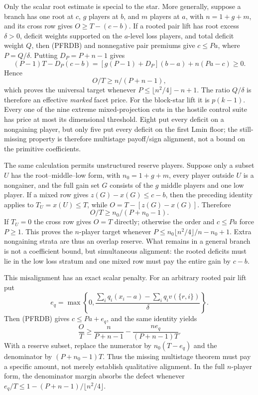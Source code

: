 \documentclass[11pt]{article}
\begin{document}
Only the scalar root estimate is special to the star.  More generally,
suppose a branch has one root at $c$, $g$ players at $b$, and $m$ players at
$a$, with $n=1+g+m$, and its cross row gives $O\ge T-(c-b)$.  If a rooted
pair lift has root excess $\delta>0$, deficit weights supported on the
$a$-level loss players, and total deficit weight $Q$, then (PFRDB) and
nonnegative pair premiums give $c\le Pa$, where $P=Q/\delta$.  Putting
$D_P=P+n-1$ gives
\[
 (P-1)T-D_P(c-b)
 =[g(P-1)+D_P](b-a)+n(Pa-c)\ge0.
\]
Hence
\[
 O/T\ge n/(P+n-1),                                    \tag{MFP}
\]
which proves the universal target whenever
$P\le\lfloor n^2/4\rfloor-n+1$.  The ratio $Q/\delta$ is therefore an
effective \emph{marked} facet price.  For the block-star lift it is
$p(k-1)$.  Every one
of the nine extreme mixed-projection cuts in the hostile control suite has
price at most its dimensional threshold.  Eight put every deficit on a
nongaining player, but only five put every deficit on the first Lmin floor;
the still-missing property is therefore multistage payoff/sign alignment,
not a bound on the primitive coefficients.

The same calculation permits unstructured reserve players.  Suppose only a
subset $U$ has the root--middle--low form, with
$n_0=1+g+m$, every player outside $U$ is a nongainer, and the full gain set
$G$ consists of the $g$ middle players and one low player.  If a mixed row
gives $z(G)-x(G)\le c-b$, then the preceding identity applies to
$T_U=x(U)\le T$, while $O=T-[z(G)-x(G)]$.  Therefore
\[
 O/T\ge n_0/(P+n_0-1).                                \tag{MFR}
\]
If $T_U=0$ the cross row gives $O=T$ directly; otherwise the order and
$c\le Pa$ force $P\ge1$.
This proves the $n$-player target whenever
$P\le n_0\lfloor n^2/4\rfloor/n-n_0+1$.  Extra nongaining strata are thus
an overlap reserve.  What remains in a general branch is not a coefficient
bound, but simultaneous alignment: the rooted deficits must lie in the low
loss stratum and one mixed row must pay the entire gain by $c-b$.

This misalignment has an exact scalar penalty.  For an arbitrary rooted pair
lift put
\[
 e_q=\max\left\{0,\frac{\sum_iq_i(x_i-a)-
                    \sum_iq_i v(\{r,i\})}{\delta}\right\}.
\]
Then (PFRDB) gives $c\le Pa+e_q$, and the same identity yields
\[
 \frac OT\ge\frac{n}{P+n-1}
 -\frac{n e_q}{(P+n-1)T}.                             \tag{MPE}
\]
With a reserve subset, replace the numerator by $n_0(T-e_q)$ and the
denominator by $(P+n_0-1)T$.  Thus the missing multistage theorem must pay a
specific amount, not merely establish qualitative alignment.  In the full
$n$-player form, the denominator margin absorbs the defect whenever
$e_q/T\le1-(P+n-1)/\lfloor n^2/4\rfloor$.
\end{document}
